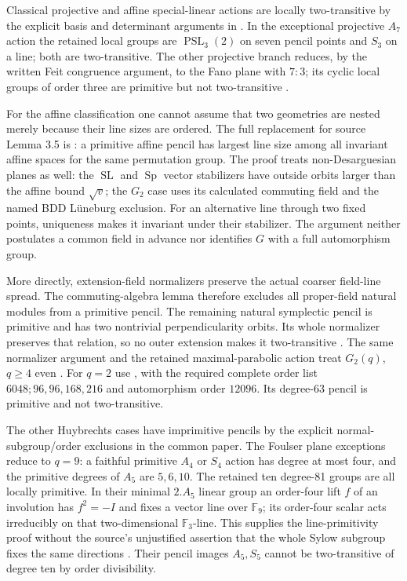 \documentclass[11pt,a4paper]{article}
\newcommand{\F}{\mathbb F}
\begin{document}
Classical projective and affine special-linear actions are locally
two-transitive by the explicit basis and determinant arguments in
\cite[Proposition~\ref{U-classical}]{U}. In the exceptional projective
$A_7$ action the retained local groups are $\operatorname{PSL}_3(2)$
on seven pencil points and $S_3$ on a line; both are two-transitive.
The other projective branch reduces, by the written Feit congruence
argument, to the Fano plane with $7:3$; its cyclic local groups of
order three are primitive but not two-transitive
\cite[Proposition~\ref{U-projectivefrobenius}]{U}.

For the affine classification one cannot assume that two geometries
are nested merely because their line sizes are ordered. The full
replacement for source Lemma 3.5 is
\cite[Theorem~\ref{U-affinemax}]{U}: a primitive affine pencil has
largest line size among all invariant affine spaces for the same
permutation group. The proof treats non-Desarguesian planes as well:
the $\operatorname{SL}$ and $\operatorname{Sp}$ vector stabilizers
have outside orbits larger than the affine bound $\sqrt v$; the
$G_2$ case uses its calculated commuting field and the named BDD
L\"uneburg exclusion. For an alternative line through two fixed
points, uniqueness makes it invariant under their stabilizer. The
argument neither postulates a common field in advance nor identifies
$G$ with a full automorphism group.

More directly, extension-field normalizers preserve the actual coarser
field-line spread. The commuting-algebra lemma therefore excludes all
proper-field natural modules from a primitive pencil. The remaining
natural symplectic pencil is primitive and has two nontrivial
perpendicularity orbits. Its whole normalizer preserves that relation,
so no outer extension makes it two-transitive
\cite[Proposition~\ref{U-symplectic}]{U}. The same normalizer argument
and the retained maximal-parabolic action treat $G_2(q)$, $q\geq4$
even \cite[Proposition~\ref{U-naturalg2}]{U}. For $q=2$ use
\cite[Proposition~\ref{U-binaryg2}]{U}, with the required complete
order list $6048;96,96,168,216$ and automorphism order $12096$.
Its degree-63 pencil is primitive and not two-transitive.

The other Huybrechts cases have imprimitive pencils by the explicit
normal-subgroup/order exclusions in the common paper. The Foulser
plane exceptions reduce to $q=9$: a faithful primitive $A_4$ or
$S_4$ action has degree at most four, and the primitive degrees of
$A_5$ are $5,6,10$. The retained ten degree-81 groups are all locally
primitive. In their minimal $2.A_5$ linear group an order-four lift
$f$ of an involution has $f^2=-I$ and fixes a vector line over $\F_9$;
its order-four scalar acts irreducibly on that two-dimensional
$\F_3$-line. This supplies the line-primitivity proof without the
source's unjustified assertion that the whole Sylow subgroup fixes the
same directions \cite[Proposition~\ref{U-nineplane}]{U}.
Their pencil images $A_5,S_5$ cannot be two-transitive of degree ten
by order divisibility.
\end{document}
